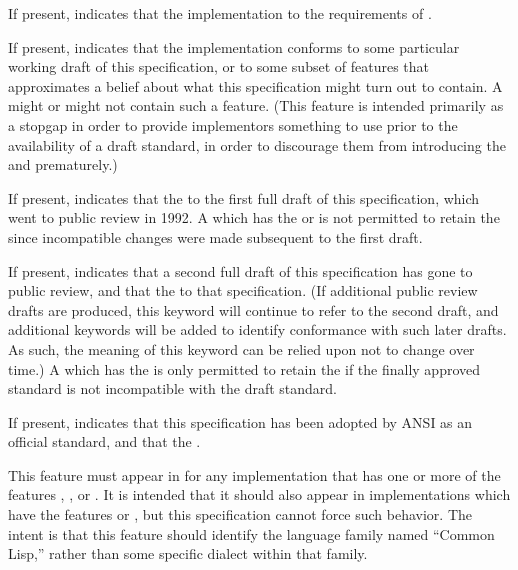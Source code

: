 
If present, indicates that the implementation 
to the requirements of \IEEEFloatingPoint.


If present, indicates that the implementation conforms to some
particular working draft of this specification, 
or to some subset of features that approximates a belief about
what this specification might turn out to contain.
A  might or might not contain
such a feature.
(This feature is intended primarily as a stopgap in order to 
provide implementors something to use prior to the availability
of a draft standard, in order to discourage them from introducing
the  and   prematurely.)


If present, indicates that the  
 to the first full draft of this specification,
which went to public review in 1992.
A 
which has the  or  
is not permitted to retain the  
since incompatible changes were made subsequent to the first draft.


If present, indicates that a second full draft of this specification
has gone to public review, and that the  
 to that specification.
(If additional public review drafts are produced, this keyword
 will continue to refer to the second draft, and additional keywords
 will be added to identify conformance with such later drafts.
 As such, the meaning of this keyword can be relied upon not to
 change over time.)
A  which has the 
 is only permitted to retain the  
 if the finally approved standard is not incompatible
with the draft standard.


If present, indicates that this specification has been adopted by ANSI
as an official standard, and that the  
.


This feature must appear in  for any implementation that
has one or more of the features , ,
or .  It is intended that it should also appear in
implementations which have the features  or ,
but this specification cannot force such behavior.  The intent is 
that this feature should identify the language family named ``Common Lisp,''
rather than some specific dialect within that family.

